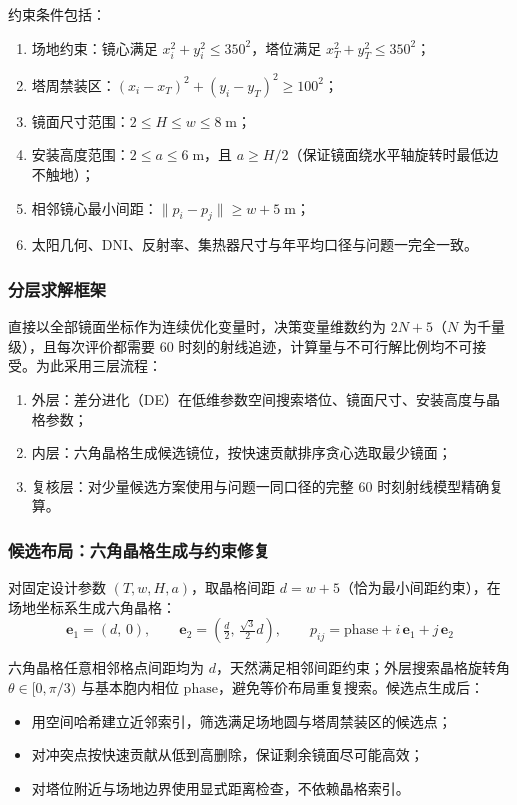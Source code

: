 \documentclass[12pt,a4paper,fontset=fandol]{ctexart}
\begin{document}
约束条件包括：
\begin{enumerate}
    \item 场地约束：镜心满足 $x_i^2 + y_i^2 \le 350^2$，塔位满足 $x_T^2 + y_T^2 \le 350^2$；
    \item 塔周禁装区：$(x_i - x_T)^2 + (y_i - y_T)^2 \ge 100^2$；
    \item 镜面尺寸范围：$2 \le H \le w \le 8\;\mathrm{m}$；
    \item 安装高度范围：$2 \le a \le 6\;\mathrm{m}$，且 $a \ge H/2$（保证镜面绕水平轴旋转时最低边不触地）；
    \item 相邻镜心最小间距：$\|p_i - p_j\| \ge w + 5\;\mathrm{m}$；
    \item 太阳几何、DNI、反射率、集热器尺寸与年平均口径与问题一完全一致。
\end{enumerate}

\subsubsection{分层求解框架}

直接以全部镜面坐标作为连续优化变量时，决策变量维数约为 $2N+5$（$N$ 为千量级），且每次评价都需要 $60$ 时刻的射线追迹，计算量与不可行解比例均不可接受。为此采用三层流程：

\begin{enumerate}
    \item 外层：差分进化（DE）在低维参数空间搜索塔位、镜面尺寸、安装高度与晶格参数；
    \item 内层：六角晶格生成候选镜位，按快速贡献排序贪心选取最少镜面；
    \item 复核层：对少量候选方案使用与问题一同口径的完整 $60$ 时刻射线模型精确复算。
\end{enumerate}

\subsubsection{候选布局：六角晶格生成与约束修复}

对固定设计参数 $(T, w, H, a)$，取晶格间距 $d = w + 5$（恰为最小间距约束），在场地坐标系生成六角晶格：
\begin{equation}
    \mathbf{e}_1 = (d,\,0), \qquad \mathbf{e}_2 = \left(\tfrac{d}{2},\, \tfrac{\sqrt{3}}{2} d\right),
    \qquad p_{ij} = \mathrm{phase} + i\,\mathbf{e}_1 + j\,\mathbf{e}_2
    \label{eq:q2_lattice}
\end{equation}

六角晶格任意相邻格点间距均为 $d$，天然满足相邻间距约束；外层搜索晶格旋转角 $\theta \in [0, \pi/3)$ 与基本胞内相位 $\mathrm{phase}$，避免等价布局重复搜索。候选点生成后：
\begin{itemize}
    \item 用空间哈希建立近邻索引，筛选满足场地圆与塔周禁装区的候选点；
    \item 对冲突点按快速贡献从低到高删除，保证剩余镜面尽可能高效；
    \item 对塔位附近与场地边界使用显式距离检查，不依赖晶格索引。
\end{itemize}
\end{document}
